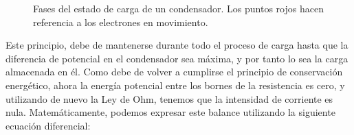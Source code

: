 \documentclass[../main.tex]{subfiles}
\begin{document}
\begin{figure}[!h]
    \centering
    \caption{Fases del estado de carga de un condensador. Los puntos rojos hacen referencia a los electrones en movimiento.}
    \label{fig::carga_condensador}
\end{figure}


Este principio, debe de mantenerse durante todo el proceso de carga hasta que la diferencia de potencial en el condensador sea máxima, y por tanto lo sea la carga almacenada en él. Como debe de volver a cumplirse el principio de conservación energético, ahora la energía potencial entre los bornes de la resistencia es cero, y utilizando de nuevo la Ley de Ohm, tenemos que la intensidad de corriente es nula. Matemáticamente, podemos expresar este balance utilizando la siguiente ecuación diferencial:
\end{document}
